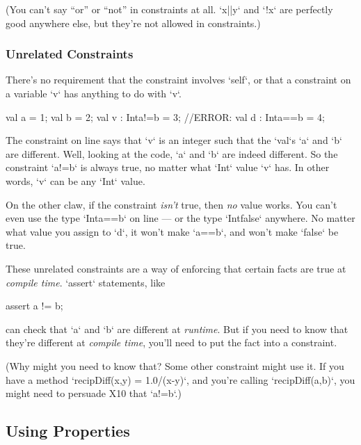 (You can't say ``or'' or ``not'' in constraints at all. \xcd`x||y` and \xcd`!x`
are perfectly good anywhere else, but they're not allowed in constraints.)

\subsubsection{Unrelated Constraints}

There's no requirement that the constraint involves \xcd`self`, or that a
constraint on a variable  \xcd`v` has anything to do with \xcd`v`.  
\begin{xtennum}[]
val a = 1;
val b = 2;
val v : Int{a!=b} = 3;
//ERROR: val d : Int{a==b} = 4; 
\end{xtennum}

The constraint on line  says that \xcd`v` is
an integer such that the \xcd`val`s \xcd`a` and \xcd`b` are different.  Well,
looking at the code, \xcd`a` and \xcd`b` are indeed different.  So the
constraint \xcd`a!=b` is always true, no matter what \xcd`Int` value \xcd`v`
has.  In other words, \xcd`v` can be any \xcd`Int` value.

On the other claw, if the constraint {\em isn't} true, then {\em no} value
works.  You can't even use the type \xcd`Int{a==b}` on line
 --- or the type \xcd`Int{false}` anywhere.
No matter what value you assign to \xcd`d`, it won't make \xcd`a==b`, and
won't make \xcd`false` be true.  

These unrelated constraints are a way of enforcing that certain facts are true
at {\em compile time}.  \xcd`assert` statements, like
\begin{xten}
assert a != b;
\end{xten}
can check that \xcd`a` and \xcd`b` are different at {\em runtime}.  But if you
need to know that they're different at {\em compile time}, you'll need to put
the fact into a constraint.  

(Why might you need to know that?  Some other constraint might use it.  
If you have a method \xcd`recipDiff(x,y) = 1.0/(x-y)`, 
and you're calling \xcd`recipDiff(a,b)`, 
you might need to persuade X10 that \xcd`a!=b`.)

\subsection{Using Properties}

